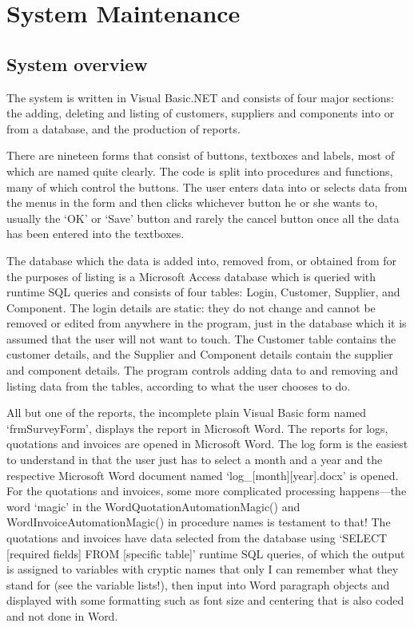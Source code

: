 \chapter{System Maintenance}

	\section{System overview}
	
	The system is written in Visual Basic.NET and consists of four
major sections: the adding, deleting and listing of customers, suppliers
and components into or from a database, and the production of reports.

	There are nineteen forms that consist of buttons, textboxes and
labels, most of which are named quite clearly.  The code is split into
procedures and functions, many of which control the buttons.  The user
enters data into or selects data from the menus in the form and then
clicks whichever button he or she wants to, usually the `OK' or `Save'
button and rarely the cancel button once all the data has been entered into
the textboxes.

	The database which the data is added into, removed from, or
obtained from for the purposes of listing is a Microsoft Access database
which is queried with runtime SQL queries and consists of four tables:
Login, Customer, Supplier, and Component.  The login details are
static: they do not change and cannot be removed or edited from anywhere
in the program, just in the database which it is assumed that the user will
not want to touch.  The Customer table contains the customer details, and
the Supplier and Component details contain the supplier and component
details.  The program controls adding data to and removing and listing
data from the tables, according to what the user chooses to do.
	
	All but one of the reports, the incomplete plain Visual Basic form
named `frmSurveyForm', displays the report in Microsoft Word.  The reports
for logs, quotations and invoices are opened in Microsoft Word.  The log
form is the easiest to understand in that the user just has to select a
month and a year and the respective Microsoft Word document named
`log\_[month][year].docx' is opened.  For the quotations and invoices, some
more complicated processing happens---the word `magic' in the
WordQuotationAutomationMagic() and WordInvoiceAutomationMagic() in procedure
names is testament to that!  The quotations and invoices have data selected
from the database using `SELECT [required fields] FROM [specific table]'
runtime SQL queries, of which the output is assigned to variables with cryptic
names that only I can remember what they stand for (see the variable
lists!), then input into Word paragraph objects and displayed with some
formatting such as font size and centering that is also coded and not done
in Word.

